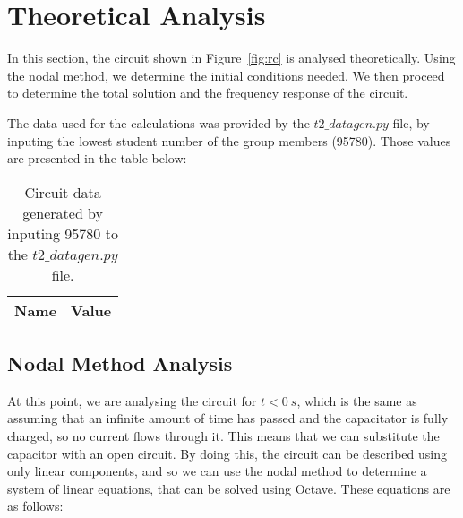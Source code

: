 \section{Theoretical Analysis}
\label{sec:analysis}

In this section, the circuit shown in Figure~\ref{fig:rc} is analysed
theoretically. Using the nodal method, we determine the initial conditions needed. We then proceed to determine the total solution and the frequency response of the circuit.

The data used for the calculations was provided by the $t2\_datagen.py$ file, by inputing the lowest student number of the group members (95780). Those values are presented in the table below:

\begin{table}[h]
  \centering
  \begin{tabular}{|l|r|}
    \hline
    {\bf Name} & {\bf Value} \\ \hline
    
  \end{tabular}
  \caption{Circuit data generated by inputing 95780 to the $t2\_datagen.py$ file.}                                                            
  \label{tab:data}                                                      
\end{table}   


\subsection{Nodal Method Analysis}

At this point, we are analysing the circuit for $t<0~s$, which is the same as assuming that an infinite amount of time has passed and the capacitator is fully charged, so no current flows through it. This means that we can substitute the capacitor with an open circuit. By doing this, the circuit can be described using only linear components, and so we can use the nodal method to determine a system of linear equations, that can be solved using Octave. These equations are as follows: 



